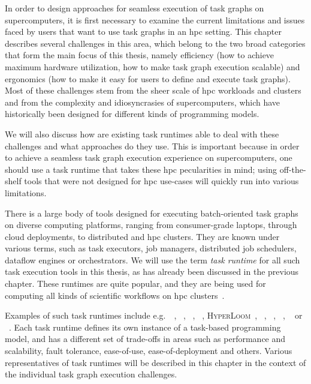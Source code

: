 In order to design approaches for seamless execution of task graphs on supercomputers, it is first necessary to examine
the current limitations and issues faced by users that want to use task graphs in an \gls{hpc} setting.
This chapter describes several challenges in this area, which belong to the two broad categories that form the main focus of this
thesis, namely efficiency (how to achieve maximum hardware utilization, how to make task graph execution scalable) and
ergonomics (how to make it easy for users to define and execute task graphs). Most of these challenges stem from the sheer
scale of \gls{hpc} workloads and clusters and from the complexity and idiosyncrasies of supercomputers, which have historically
been designed for different kinds of programming models.

We will also discuss how are existing task runtimes able to deal with these challenges and what approaches do they use.
This is important because in order to achieve a seamless task graph execution experience on supercomputers, one should
use a task runtime that takes these \gls{hpc} pecularities in mind; using off-the-shelf tools that
were not designed for \gls{hpc} use-cases will quickly run into various limitations.

There is a large body of tools designed for executing batch-oriented task graphs on diverse computing
platforms, ranging from consumer-grade laptops, through cloud deployments, to distributed and
\gls{hpc} clusters. They are known under various terms, such as task executors,
job managers, distributed job schedulers, dataflow engines or orchestrators. We will use the term
\emph{task runtime} for all such task execution tools in this thesis, as has already been
discussed in the previous chapter. These runtimes are quite popular, and they are being used for
computing all kinds of scientific workflows on \gls{hpc}
clusters~\cite{hpc_tasks, hpc_tasks_2, hpc_tasks_3, pegasus}.

Examples of such task runtimes include e.g.\ \dask~\cite{dask},
\parsl~\cite{parsl}, \ray~\cite{ray},
\pycompss~\cite{pycompss}, \textsc{HyperLoom}~\cite{hyperloom},
\gnuparallel~\cite{parallel}, \snakemake~\cite{snakemake}, \merlin~\cite{merlin},
\autosubmit~\cite{autosubmit} or \fireworks~\cite{fireworks}. Each task runtime
defines its own instance of a task-based programming model, and has a different set of trade-offs
in areas such as performance and scalability, fault tolerance, ease-of-use, ease-of-deployment and
others. Various representatives of task runtimes will be described in
this chapter in the context of the individual task graph execution challenges.

